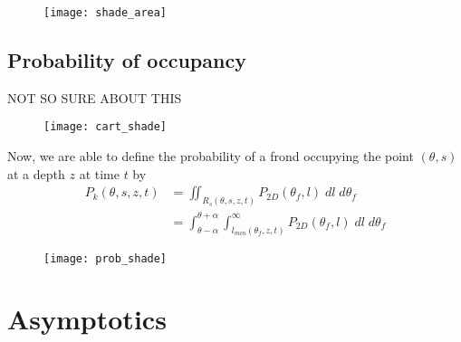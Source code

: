 \begin{figure}[h]
	\centering
	\texttt{[image: shade\_area]}
	\vspace{-2em}
	\label{fig:shade_area}
\end{figure}

\subsection{Probability of occupancy}
NOT SO SURE ABOUT THIS

\begin{figure}[h]
	\centering
	\texttt{[image: cart\_shade]}
	\vspace{-3em}
	\label{fig:cart_shade}
\end{figure}

Now, we are able to define the probability of a frond occupying the point $(\theta,s)$ at a depth $z$ at time $t$ by
\begin{align}
		P_k(\theta,s,z,t)	&= \iint_{R_s(\theta,s,z,t)}
								P_{2D}(\theta_f,l)
								\;dl\;d\theta_f \nonumber \\
							&= \int_{\theta-\alpha}^{\theta+\alpha} 
								\int_{l_{min}(\theta_f,z,t)}^\infty
								P_{2D}(\theta_f,l)
								\;dl\;d\theta_f
\end{align}

\begin{figure}[h]
	\centering
	\texttt{[image: prob\_shade]}
	\vspace{-2em}
	\label{fig:prob_shade}
\end{figure}


\section{Asymptotics}
